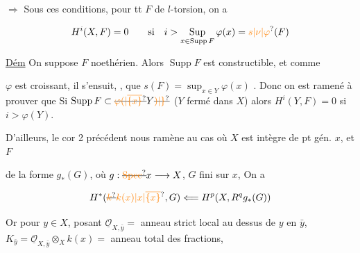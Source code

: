 $\Rightarrow$ Sous ces conditions, pour tt $F$ de $l$-torsion, on a

\[
H^i(X,F)=0\qquad\text{si}\quad i>\operatorname*{Sup}_{x\in\operatorname{Supp} F}\varphi(x)=\unsure{s|\nu|\varphi}(F)
\]

\uline{Dém}   On  suppose $F$ noethérien. Alors  $\operatorname{Supp}F$ est constructible, et comme

$\varphi$ est   croissant, il s'ensuit,  ,  que $s(F)=\sup_{x\in Y}\varphi(x)$  . Donc on est ramené  à prouver que Si $\operatorname{Supp}F\subset\deleted{\unsure{\varphi(|\overline{\{x\}}}}Y\deleted{\unsure{)|\}}}$ ($Y$ fermé dans $X$) alors $H^i(Y,F)=0$ si $i>\varphi(Y)$.


D'ailleurs, le cor 2 précédent nous ramène au cas où $X$ est intègre  de pt gén. $x$, et $F$

de la forme $g_*(G)$, où $g:\deleted{\unsure{\operatorname{Spec}}}x\longrightarrow X$, $G$ fini sur  $x$,  On a

\[
H^*(\deleted{\unsure{k}}\unsure{k(x)|x|\overline{\{x\}}},G)\Longleftarrow H^p(X,R^q g_*(G))
\]


Or pour $y\in X$, posant $\underline{\mathcal O}_{X,\bar y}={}$ anneau strict local au dessus de $y$ en $\bar y$,  $K_{\bar y}=\underline{\mathcal O}_{X,\bar y}\otimes_X k(x)={}$ anneau total des fractions,

